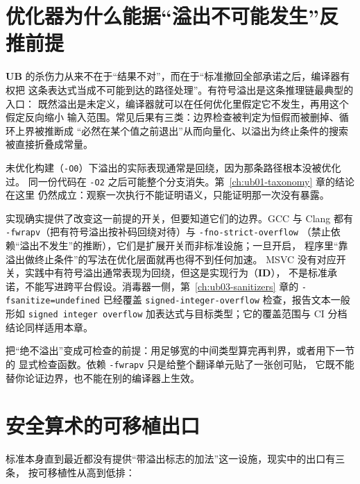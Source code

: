 \documentclass[12pt,a4paper,fontset=fandol]{ctexbook}
\newcommand{\Tp}[1]{\texttt{#1}}
\newcommand{\Bk}{\discretionary{}{}{}}
\newcommand{\UB}{\textbf{\textsf{UB}}}
\newcommand{\IDB}{\textbf{\textsf{ID}}}
\begin{document}
\section{优化器为什么能据“溢出不可能发生”反推前提}\label{sec:ub09-optimizer}

\UB{} 的杀伤力从来不在于“结果不对”，而在于“标准撤回全部承诺之后，编译器有权把
这条表达式当成不可能到达的路径处理”。有符号溢出是这条推理链最典型的入口：
既然溢出是未定义，编译器就可以在任何优化里假定它不发生，再用这个假定反向缩小
输入范围。常见后果有三类：边界检查被判定为恒假而被删掉、循环上界被推断成
“必然在某个值之前退出”从而向量化、以溢出为终止条件的搜索被直接折叠成常量。

\begin{warning}[title={“它现在能跑”不是证据}]
未优化构建（\Tp{-O0}）下溢出的实际表现通常是回绕，因为那条路径根本没被优化过。
同一份代码在 \Tp{-O2} 之后可能整个分支消失。第~\ref{ch:ub01-taxonomy} 章的结论在这里
仍然成立：观察一次执行不能证明语义，只能证明那一次没有暴露。
\end{warning}

实现确实提供了改变这一前提的开关，但要知道它们的边界。GCC 与 Clang 都有
\Tp{-fwrapv}（把有符号溢出按补码回绕对待）与 \Tp{-fno-{\Bk}strict-{\Bk}overflow}
（禁止依赖“溢出不发生”的推断），它们是扩展开关而非标准设施；一旦开启，
程序里“靠溢出做终止条件”的写法在优化层面就再也得不到任何加速。
MSVC 没有对应开关，实践中有符号溢出通常表现为回绕，但这是实现行为（\IDB{}），
不是标准承诺，不能写进跨平台假设。消毒器一侧，第~\ref{ch:ub03-sanitizers} 章的
\Tp{-fsanitize{\Bk}=undefined} 已经覆盖 \Tp{signed-{\Bk}integer-{\Bk}overflow} 检查，报告文本一般形如
\Tp{signed integer overflow} 加表达式与目标类型；它的覆盖范围与 CI 分档结论同样适用本章。

\begin{bestpractice}[title={优先证界，不靠开关}]
把“绝不溢出”变成可检查的前提：用足够宽的中间类型算完再判界，或者用下一节的
显式检查函数。依赖 \Tp{-fwrapv} 只是给整个翻译单元贴了一张创可贴，
它既不能替你论证边界，也不能在别的编译器上生效。
\end{bestpractice}

\section{安全算术的可移植出口}\label{sec:ub09-safe}

标准本身直到最近都没有提供“带溢出标志的加法”这一设施，现实中的出口有三条，
按可移植性从高到低排：
\end{document}
